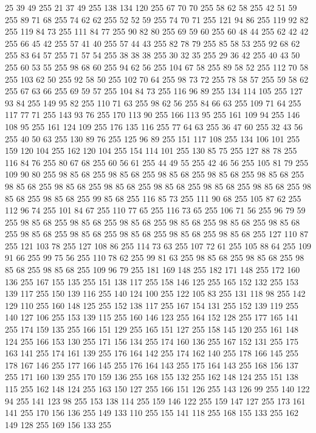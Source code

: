 25 39 49 255 21 37 49 255 138 134 120 255 67 70 70 255 58 62 58 255 42 51 59 255 89 71 68 255 74 62 62 255 52 52 59 255 74 70 71 255 121 94 86 255 119 92 82 255 119 84 73 255 111 84 77 255 90 82 80 255 69 59 60 255 60 48 44 255 62 42 42 255 66 45 42 255 57 41 40 255 57 44 43 255 82 78 79 255 85 58 53 255 92 68 62 255 83 64 57 255 71 57 54 255 38 38 38 255 30 32 35 255 29 36 42 255 40 43 50 255 60 53 55 255 98 68 60 255 94 62 56 255 104 67 58 255 89 58 52 255 112 70 58 255 103 62 50 255 92 58 50 255 102 70 64 255 98 73 72 255 78 58 57 255 59 58 62 255 67 63 66 255 69 59 57 255 104 84 73 255 116 96 89 255 134 114 105 255 127 93 84 255 149 95 82 255 110 71 63 255 98 62 56 255 84 66 63 255 109 71 64 255 117 77 71 255 143 93 76 255 170 113 90 255 166 113 95 255 161 109 94 255 146 108 95 255 161 124 109 255 176 135 116 255 77 64 63 255 36 47 60 255 32 43 56 255
40 50 63 255 130 89 76 255 125 96 89 255 151 117 108 255 134 106 101 255 159 120 104 255 162 120 104 255 154 114 101 255 130 85 75 255 127 88 78 255 116 84 76 255 80 67 68 255 60 56 61 255 44 49 55 255 42 46 56 255 105 81 79 255 109 90 80 255 98 85 68 255 98 85 68 255 98 85 68 255 98 85 68 255 98 85 68 255 98 85 68 255 98 85 68 255 98 85 68 255 98 85 68 255 98 85 68 255 98 85 68 255 98 85 68 255 98 85 68 255 99 85 68 255 116 85 73 255 111 90 68 255 105 87 62 255 112 96 74 255 101 84 67 255 110 77 65 255 116 73 65 255 106 71 56 255 96 79 59 255 98 85 68 255 98 85 68 255 98 85 68 255 98 85 68 255 98 85 68 255 98 85 68 255 98 85 68 255 98 85 68 255 98 85 68 255 98 85 68 255 98 85 68 255 127 110 87 255 121 103 78 255 127 108 86 255 114 73 63 255 107 72 61 255 105 88 64 255 109 91 66 255 99 75 56 255 110 78 62 255 99 81 63 255 98 85 68 255 98 85 68 255 98 85 68 255
98 85 68 255 109 96 79 255 181 169 148 255 182 171 148 255 172 160 136 255 167 155 135 255 151 138 117 255 158 146 125 255 165 152 132 255 153 139 117 255 150 139 116 255 140 124 100 255 122 105 83 255 131 118 98 255 142 129 110 255 160 148 125 255 152 138 117 255 167 154 131 255 152 139 119 255 140 127 106 255 153 139 115 255 160 146 123 255 164 152 128 255 177 165 141 255 174 159 135 255 166 151 129 255 165 151 127 255 158 145 120 255 161 148 124 255 166 153 130 255 171 156 134 255 174 160 136 255 167 152 131 255 175 163 141 255 174 161 139 255 176 164 142 255 174 162 140 255 178 166 145 255 178 167 146 255 177 166 145 255 176 164 143 255 175 164 143 255 168 156 137 255 171 160 139 255 170 159 136 255 168 155 132 255 162 148 124 255 151 138 115 255 162 148 124 255 163 150 127 255 166 151 126 255 143 126 99 255 140 122 94 255 141 123 98 255 153 138 114 255 159 146 122 255 159 147 127 255 173 161 141 255 170 156 136 255 149 133 110 255 155 141 118 255 168 155 133 255 162 149 128 255 169 156 133 255
